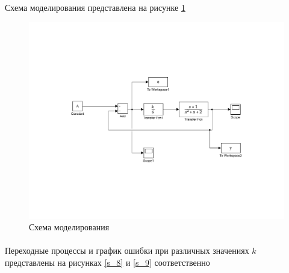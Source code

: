 \documentclass[a4paper,12pt]{article}
\begin{document}
	\paragraph {} Схема моделирования представлена на рисунке \ref{s_7}
	
	\begin{figure}[h]
		\renewcommand{\figurename}{Рисунок}
		\centering
		\includegraphics[width=6in]{Astatizm10MOD.pdf}
		\caption{Схема моделирования}
		\label{s_7}
	\end{figure}
	\newpage
	\paragraph {}Переходные процессы и график ошибки при различных значениях $k$ представлены на рисунках \ref{s_8} и \ref{s_9} соответственно
	
\end{document}
